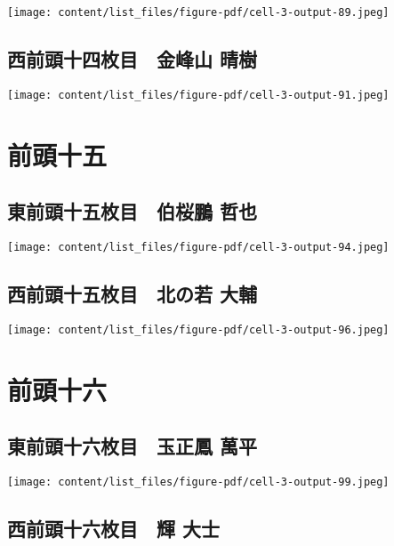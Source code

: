 \documentclass[
  letterpaper,
]{bxjsbook}
\begin{document}
\texttt{[image: content/list\_files/figure-pdf/cell-3-output-89.jpeg]}

\subsection{西前頭十四枚目　金峰山
晴樹}\label{ux897fux524dux982dux5341ux56dbux679aux76ee-ux91d1ux5cf0ux5c71-ux6674ux6a39}

\texttt{[image: content/list\_files/figure-pdf/cell-3-output-91.jpeg]}

\section{前頭十五}\label{ux524dux982dux5341ux4e94}

\subsection{東前頭十五枚目　伯桜鵬
哲也}\label{ux6771ux524dux982dux5341ux4e94ux679aux76ee-ux4f2fux685cux9d6c-ux54f2ux4e5f}

\texttt{[image: content/list\_files/figure-pdf/cell-3-output-94.jpeg]}

\subsection{西前頭十五枚目　北の若
大輔}\label{ux897fux524dux982dux5341ux4e94ux679aux76ee-ux5317ux306eux82e5-ux5927ux8f14}

\texttt{[image: content/list\_files/figure-pdf/cell-3-output-96.jpeg]}

\section{前頭十六}\label{ux524dux982dux5341ux516d}

\subsection{東前頭十六枚目　玉正鳳
萬平}\label{ux6771ux524dux982dux5341ux516dux679aux76ee-ux7389ux6b63ux9cf3-ux842cux5e73}

\texttt{[image: content/list\_files/figure-pdf/cell-3-output-99.jpeg]}

\subsection{西前頭十六枚目　輝
大士}\label{ux897fux524dux982dux5341ux516dux679aux76ee-ux8f1d-ux5927ux58eb}
\end{document}
